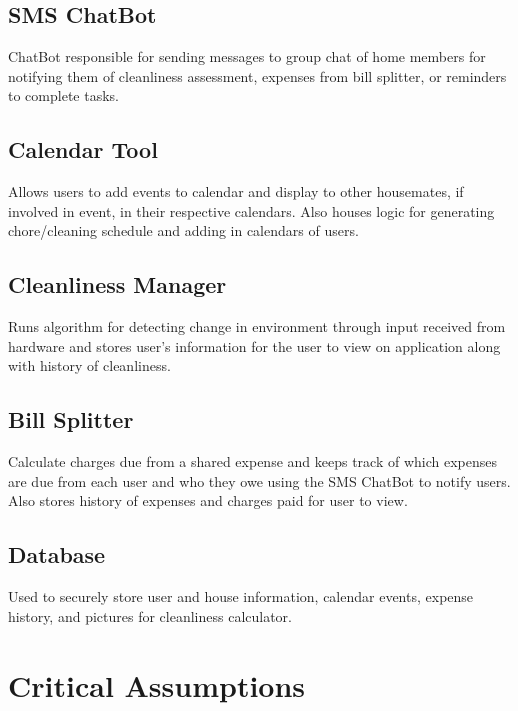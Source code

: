 \documentclass[12pt, titlepage]{article}
\begin{document}
\subsection{SMS ChatBot}
ChatBot responsible for sending messages to group chat of home members for notifying them of cleanliness assessment, expenses from bill splitter, or reminders to complete tasks.

\subsection{Calendar Tool}
Allows users to add events to calendar and display to other housemates, if involved in event, in their respective calendars. Also houses logic for generating chore/cleaning schedule and adding in calendars of users.

\subsection{Cleanliness Manager}
Runs algorithm for detecting change in environment through input received from hardware and stores user's information for the user to view on application along with history of cleanliness.

\subsection{Bill Splitter}
Calculate charges due from a shared expense and keeps track of which expenses are due from each user and who they owe using the SMS ChatBot to notify users. Also stores history of expenses and charges paid for user to view.

\subsection{Database}
Used to securely store user and house information, calendar events, expense history, and pictures for cleanliness calculator.


\section{Critical Assumptions}
\end{document}
